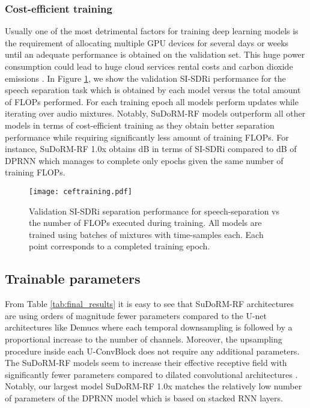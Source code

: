 \documentclass{article}
\theoremstyle{definition}
\newcommand{\sudo}{SuDoRM-RF }
\newcommand{\sudol}{SuDoRM-RF 1.0x }
\begin{document}
\subsubsection{Cost-efficient training}
Usually one of the most detrimental factors for training deep learning models is the requirement of allocating multiple GPU devices for several days or weeks until an adequate performance is obtained on the validation set. This huge power consumption could lead to huge cloud services rental costs and carbon dioxide emissions \cite{cai2019onceandforall}. In Figure \ref{fig:costefficienttraining}, we show the validation SI-SDRi performance for the speech separation task which is obtained by each model versus the total amount of FLOPs performed. For each training epoch all models perform updates while iterating over  audio mixtures. Notably, \sudo models outperform all other models in terms of cost-efficient training as they obtain better separation performance while requiring significantly less amount of training FLOPs. For instance, \sudol obtains dB in terms of SI-SDRi compared to dB of DPRNN \cite{luo2019dual} which manages to complete only  epochs given the same number of training FLOPs.   

\begin{figure}[!htb]
    \centering
      \texttt{[image: ceftraining.pdf]}
      \caption{Validation SI-SDRi separation performance for speech-separation vs the number of FLOPs executed during training. All models are trained using batches of  mixtures with  time-samples each. Each point corresponds to a completed training epoch.}
      \label{fig:costefficienttraining}
    \vspace{-10pt}
\end{figure}
\subsection{Trainable parameters}
From Table \ref{tab:final_results} it is easy to see that \sudo architectures are using orders of magnitude fewer parameters compared to the U-net architectures like Demucs \cite{defossez2019demucs} where each temporal downsampling is followed by a proportional increase to the number of channels. Moreover, the upsampling procedure inside each U-ConvBlock does not require any additional parameters. The \sudo models seem to increase their effective receptive field with significantly fewer parameters compared to dilated convolutional architectures \cite{luo2019convTasNet, tzinis2019two}.  Notably, our largest model \sudol matches the relatively low number of parameters of the DPRNN \cite{luo2019dual} model which is based on stacked RNN layers.
\end{document}
